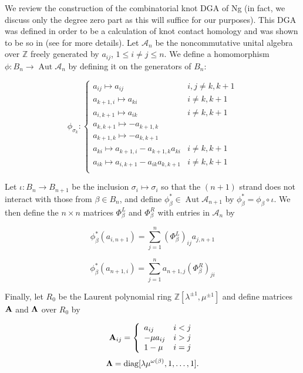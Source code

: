 \documentclass[11pt]{amsart}
\def\Z{{\mathbb Z}}
\def\A{{\mathcal A}}
\def\s{{\sigma}}
\newcommand\Aut{\operatorname{Aut}}
\newcommand\diag{\operatorname{diag}}
\theoremstyle{definition}
\begin{document}
  We review the construction of the combinatorial knot DGA of Ng (in fact, we discuss only the degree zero part as this will suffice for our purposes). This DGA was defined in order to be a calculation of knot contact homology and was shown to be so in \cite{EENS12} (see \cite{Ng12} for more details). Let $\A_n$ be the noncommutative unital algebra over $\Z$ freely generated by $a_{ij}$, $1\le i\ne j\le n$. We define a homomorphism $\phi : B_n \rightarrow\Aut \A_n$ by defining it on the generators of $B_n$:

  \begin{equation}
  \phi_{\s_k}\colon
  \left\{
       \begin{array}{lr}
         a_{ij}\mapsto a_{ij} & i,j\ne k,k+1\\
         a_{k+1,i}\mapsto a_{ki} & i\ne k,k+1\\
         a_{i,k+1}\mapsto a_{ik} & i\ne k,k+1\\
         a_{k,k+1}\mapsto -a_{k+1,k} & \\
         a_{k+1,k}\mapsto -a_{k,k+1} & \\
         a_{ki}\mapsto a_{k+1,i} - a_{k+1,k}a_{ki} & i\ne k,k+1\\
         a_{ik}\mapsto a_{i,k+1} - a_{ik}a_{k,k+1} & i\ne k,k+1\\
       \end{array}
  \right.
  \label{DefnPhiMap}
  \end{equation}

  Let $\iota\colon B_n \rightarrow B_{n+1}$ be the inclusion $\s_i\mapsto\s_i$ so that the $(n+1)$ strand does not interact with those from $\beta\in B_n$, and define $\phi_\beta^*\in \Aut \A_{n+1}$ by $\phi_\beta^* = \phi_\beta\circ\iota$. We then define the $n\times n$ matrices $\Phi_\beta^L$ and $\Phi_\beta^R$ with entries in $\A_n$ by

  $$\phi_\beta^*(a_{i,n+1}) = \sum_{j=1}^n(\Phi_\beta^L)_{ij}a_{j,n+1}$$

  $$\phi_\beta^*(a_{n+1,i}) = \sum_{j=1}^na_{n+1,j}(\Phi_\beta^R)_{ji}$$

  Finally, let $R_0$ be the Laurent polynomial ring $\Z[\lambda^{\pm1},\mu^{\pm1}]$ and define matrices $\bf{A}$ and $\bf{\Lambda}$ over $R_0$ by

  \begin{equation}
  {\bf A}_{ij} = 
  \left\{
       \begin{array}{lr}
        a_{ij} & i<j\\
        -\mu a_{ij} & i>j\\
        1-\mu & i = j\\
       \end{array}
  \right.
  \label{def:Amatrix}
  \end{equation}
  \begin{equation}
  {\bf \Lambda} = \diag[\lambda\mu^{\omega(\beta)},1,\ldots,1].
  \label{defn:Lambda}
  \end{equation}
\end{document}
